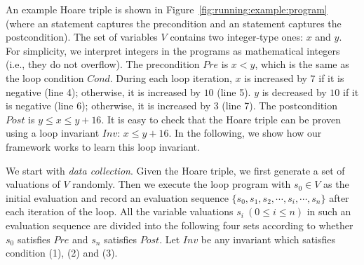 \begin{example}
An example Hoare triple is shown in Figure~\ref{fig:running:example:program} (where an  statement captures the precondition and an  statement captures the postcondition). 
The set of variables $V$ contains two integer-type ones: $x$ and $y$. 
For simplicity, we interpret integers in the programs as mathematical integers (i.e., they do not overflow). 
The precondition $\mathit{Pre}$ is $\mathit{x < y}$, which is the same as the loop condition $\mathit{Cond}$.
During each loop iteration, $x$ is increased by $7$ if it is negative (line 4); otherwise, it is increased by $10$ (line 5). 
$y$ is decreased by $10$ if it is negative (line 6); 
otherwise, it is increased by $3$ (line 7). 
The postcondition $\mathit{Post}$ is $\mathit{y \le x \le y + 16}$. 
It is easy to check that the Hoare triple can be proven using a loop invariant $\mathit{Inv}$: $\mathit{x \le y + 16}$. 
In the following, we show how our framework works to learn this loop invariant.
\end{example}
We start with \emph{data collection}. Given the Hoare triple, we first  generate a set of valuations of $V$ randomly. 
Then we execute the loop program with $s_0 \in V$ as the initial evaluation and record an evaluation sequence $\{s_0, s_1, s_2, \cdots, s_i, \cdots, s_n\}$ after each iteration of the loop. 
All the variable valuations $s_i~(0 \leq i \leq n)$ in such an evaluation sequence are divided into the following four sets according to whether $s_0$ satisfies $\mathit{Pre}$ and $s_n$ satisfies $\mathit{Post}$.
Let $\mathit{Inv}$ be any invariant which satisfies condition (1), (2) and (3). 
